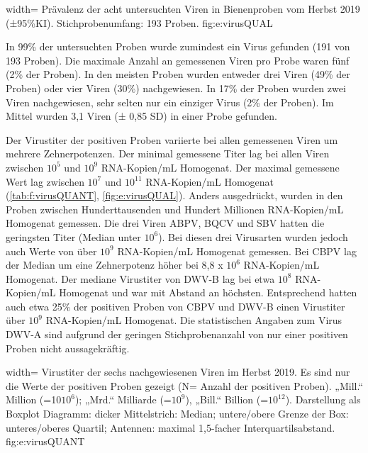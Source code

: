   {width=\textwidth} %
  {Prävalenz der acht untersuchten Viren in Bienenproben vom Herbst 2019 (±95\%KI). Stichprobenumfang: 193 Proben.} %
  {} %
  {fig:e:virusQUAL} %

In 99\% der untersuchten Proben wurde zumindest ein Virus gefunden (191 von 193 Proben). Die maximale Anzahl an gemessenen Viren pro Probe waren fünf (2\% der Proben). In den meisten Proben wurden entweder drei Viren (49\% der Proben) oder vier Viren (30\%) nachgewiesen. In 17\% der Proben wurden zwei Viren nachgewiesen, sehr selten nur ein einziger Virus (2\% der Proben). Im Mittel wurden 3,1 Viren (± 0,85 SD) in einer Probe gefunden.



Der Virustiter der positiven Proben variierte bei allen gemessenen Viren um mehrere Zehnerpotenzen. Der minimal gemessene Titer lag bei allen Viren zwischen $10^5$ und $10^9$ RNA-Kopien/\si{\milli\liter} Homogenat. Der maximal gemessene Wert lag zwischen $10^7$ und $10^{11}$ RNA-Kopien/\si{\milli\liter} Homogenat (\cref{tab:f:virusQUANT}, \cref{fig:e:virusQUAL}). Anders ausgedrückt, wurden in den Proben zwischen Hunderttausenden und Hundert Millionen RNA-Kopien/\si{\milli\liter} Homogenat gemessen. Die drei Viren ABPV, BQCV und SBV hatten die geringsten Titer (Median unter $10^6$). Bei diesen drei Virusarten wurden jedoch auch Werte von über $10^9$ RNA-Kopien/\si{\milli\liter} Homogenat gemessen. Bei CBPV lag der Median um eine Zehnerpotenz höher bei 8,8 x $10^6$ RNA-Kopien/\si{\milli\liter} Homogenat. Der mediane Virustiter von DWV-B lag bei etwa $10^8$ RNA-Kopien/\si{\milli\liter} Homogenat und war mit Abstand an höchsten. Entsprechend hatten auch etwa 25\% der positiven Proben von CBPV und DWV-B einen Virustiter über $10^9$ RNA-Kopien/\si{\milli\liter} Homogenat. Die statistischen Angaben zum Virus DWV-A sind aufgrund der geringen Stichprobenanzahl von nur einer positiven Proben nicht aussagekräftig.


  {width=\textwidth} %
  {Virustiter der sechs nachgewiesenen Viren im Herbst 2019. Es sind nur die Werte der positiven Proben gezeigt (N= Anzahl der positiven Proben). „Mill.“ Million (=10$10^6$); „Mrd.“ Milliarde (=$10^9$), „Bill.“ Billion (=$10^{12}$). Darstellung als Boxplot Diagramm: dicker Mittelstrich: Median; untere/obere Grenze der Box: unteres/oberes Quartil; Antennen: maximal 1,5-facher Interquartilsabstand.} %
  {} %
  {fig:e:virusQUANT} %


